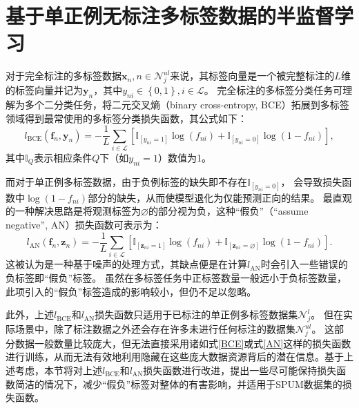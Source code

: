 
\section{基于单正例无标注多标签数据的半监督学习}\label{Char3_LossDesign}
对于完全标注的多标签数据$\boldsymbol x_n,n\in\mathcal{N}_j^{ul}$来说，其标签向量是一个被完整标注的$L$维的标签向量并记为$\boldsymbol y_n$，其中$y_{ni} \in \left\{0,1\right\}, i \in \mathcal{L}$。
完全标注的多标签分类任务可理解为多个二分类任务，将二元交叉熵（binary cross-entropy, BCE）拓展到多标签领域得到最常使用的多标签分类损失函数\cite{Durand_EPR_2019, Nam_BCE_2014}，其公式如下：
\begin{equation}
    \label{BCE}
    l_{\mathrm{BCE}}\left(\boldsymbol{f}_{n}, \boldsymbol{y}_{n}\right)= 
    - \frac{1}{L} \sum_{i \in \mathcal{L}}\left[ \mathbb{I}_{\left[y_{ni}=1\right]} \log \left({f}_{n i}\right)
    +\mathbb{I}_{\left[y_{ni}=0\right]} \log \left(1-{f}_{n i}\right)\right],
\end{equation}
其中$\mathbb{I}_{Q}$表示相应条件$Q$下（如$y_{ni}=1$）数值为1。

而对于单正例多标签数据，由于负例标签的缺失即不存在$\mathbb{I}_{\left[y_{ni}=0\right]}$，
会导致损失函数中$\log \left(1-f_{n i}\right)$部分的缺失，从而使模型退化为仅能预测正向的结果。
最直观的一种解决思路是将观测标签为$\varnothing$的部分视为负，{这种“假负”（“assume negative”, AN）损失函数可表示为：}
\begin{equation}
    \label{AN}
    l_{\mathrm{AN}}\left(\boldsymbol{f}_{n}, \boldsymbol{z}_{n}\right) 
    =-\frac{1}{L} \sum_{i \in \mathcal{L}}\left[\mathbb{I}_{\left[\boldsymbol z_{n i}=1\right]} \log \left(f_{n i}\right)
    +\mathbb{I}_{\left[\boldsymbol z_{n i} = \varnothing \right]} \log \left(1-f_{n i}\right)\right].
\end{equation}
这被认为是一种基于噪声的处理方式，其缺点便是在计算$l_{\mathrm{AN}}$时会引入一些错误的负标签即“假负”标签。
{虽然在多标签任务中正标签数量一般远小于负标签数量}，此项引入的“假负”标签造成的影响较小，但仍不足以忽略。

{此外，上述$l_{\mathrm{BCE}}$和$l_{\mathrm{AN}}$损失函数只适用于已标注的单正例多标签数据集$\mathcal{N}_j^l$。
但在实际场景中，除了标注数据之外还会存在许多未进行任何标注的数据集$\mathcal{N}_j^{ul}$。
这部分数据一般数量比较庞大，但无法直接采用诸如式\eqref{BCE}或式\eqref{AN}这样的损失函数进行训练，从而无法有效地利用隐藏在这些庞大数据资源背后的潜在信息。基于上述考虑，本节将对上述$l_{\mathrm{BCE}}$和$l_{\mathrm{AN}}$损失函数进行改进，提出一些尽可能保持损失函数简洁的情况下，减少“假负”标签对整体的有害影响，并适用于SPUM数据集的损失函数。}

